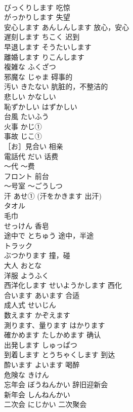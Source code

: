 \documentclass[8pt]{extreport}
\begin{document}
\begin{CJK}{UTF8}{min}
\\	びっくりします	吃惊	
\\	がっかりします	失望	
\\	安心します	あんしんします 放心，安心	
\\	遅刻します	ちこく 迟到	
\\	早退します	そうたいします	
\\	離婚します	りこんします	
\\	複雑な	ふくざつ	
\\	邪魔な	じゃま 碍事的	
\\	汚い	きたない 肮脏的，不整洁的	
\\	悲しい	かなしい	
\\	恥ずかしい	はずかしい	
\\	台風	たいふう	
\\	火事	かじ①	
\\	事故	じこ①	
\\	［お］見合い	相亲	
\\	電話代	だい 话费	
\\	〜代	～费	
\\	フロント	前台 
\\	〜号室	〜ごうしつ	
\\	汗	あせ① (汗をかきます 出汗)	
\\	タオル	
\\	毛巾	
\\	せっけん	香皂	
\\	途中で	とちゅう 途中，半途	
\\	トラック	
\\	ぶつかります	撞，碰	
\\	大人	おとな	
\\	洋服	ようふく	
\\	西洋化します	せいようかします 西化	
\\	合います	あいます 合适	
\\	成人式	せいじん	
\\	数えます	かぞえます	
\\	測ります、量ります	はかります	
\\	確かめます	たしかめます 确认	
\\	出発します	しゅっぱつ	
\\	到着します	とうちゃくします 到达	
\\	酔います	よいます 喝醉	
\\	危険な	きけん	
\\	忘年会	ぼうねんかい 辞旧迎新会	
\\	新年会	しんねんかい	
\\	二次会	にじかい 二次聚会	

\end{CJK}
\end{document}

